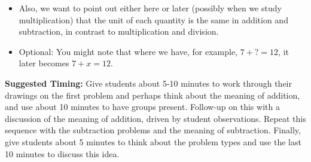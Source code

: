 \documentclass{ximera}
\begin{document}
\begin{instructorNotes}
\begin{itemize}
	\item Also, we want to point out either here or later (possibly when we study multiplication) that the unit of each quantity is the same in addition and subtraction, in contrast to multiplication and division.
	\item Optional: You might note that where we have, for example, $7 + ? = 12$, it later becomes $7 + x = 12$.
\end{itemize}

{\bf Suggested Timing:} Give students about 5-10 minutes to work through their drawings on the first problem and perhaps think about the meaning of addition, and use about 10 minutes to have groups present. Follow-up on this with a discussion of the meaning of addition, driven by student observations. Repeat this sequence with the subtraction problems and the meaning of subtraction. Finally, give students about 5 minutes to think about the problem types and use the last 10 minutes to discuss this idea.
\end{instructorNotes}
\end{document}
